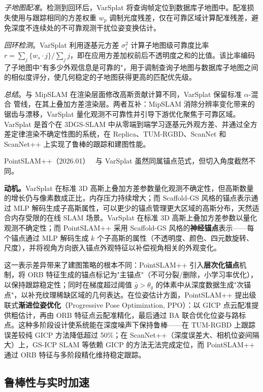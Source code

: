 \textit{子地图配准}。检测到回环后，VarSplat 将查询帧定位到数据库子地图中。配准损失使用与跟踪相同的方差权重 $w_p$ 调制光度残差，仅在可靠区域计算配准残差，避免深度不连续处的不可靠观测干扰位姿变换估计。

\textit{回环检测}。VarSplat 利用逐基元方差 $\sigma_i^2$ 计算子地图级可靠度比率 $r = \sum_j \{w_s \cdot j\} / \sum_j j$，即在应用方差加权前后不透明度之和的比值。该比率编码了子地图中"有多少外观信息是可靠的"，用于调制查询子地图与数据库子地图之间的相似度评分，使几何稳定的子地图获得更高的匹配优先级。

\textit{总结}。与 MipSLAM 在渲染层面修改高斯贡献计算不同，VarSplat 保留标准 $\alpha$-混合 管线，在其上叠加方差渲染层。两者互补：MipSLAM 消除分辨率变化带来的锯齿与漂移，VarSplat 量化观测不可靠性并引导下游优化聚焦于可靠区域。VarSplat 是首个在 3DGS-SLAM 中从零端到端学习逐基元外观方差、并通过全方差定律渲染不确定性图的系统，在 Replica、TUM-RGBD、ScanNet 和 ScanNet++ 上实现了鲁棒的跟踪和建图性能。

PointSLAM++（2026.01）~\cite{2601_11617} 与 VarSplat 虽然同属锚点范式，但切入角度截然不同。

\textbf{动机。}VarSplat 在标准 3D 高斯上叠加方差参数量化观测不确定性，但高斯数量的增长仍与像素数成正比，内存压力持续增大；而 Scaffold-GS 风格的锚点表示通过 MLP 解码生成子高斯属性，可以更少的锚点管理更大区域的高斯分布，天然适合内存受限的在线 SLAM 场景。VarSplat 在标准 3D 高斯上叠加方差参数以量化观测不确定性；而 PointSLAM++ 采用 Scaffold-GS 风格的\textbf{神经锚点}表示——每个锚点通过 MLP 解码生成 $k$ 个子高斯的属性（不透明度、颜色、四元数旋转、尺度），并将视角方向嵌入锚点外观特征以补偿视角相关的外观变化。

这一表示差异带来了建图策略的根本不同：PointSLAM++ 引入\textbf{层次化锚点}机制，将 ORB 特征生成的锚点标记为"主锚点"（不可分裂/删除，小学习率优化），以保持跟踪稳定性；同时在梯度超过阈值 $\bar{g} > \theta_g$ 的体素中从深度数据生成"次锚点"，以补充纹理稀缺区域的几何表达。在位姿估计方面，PointSLAM++ 提出级联式\textbf{渐进位姿优化}（Progressive Pose Optimization, PPO）：以 GICP 点云配准提供粗估计，再由 ORB 特征点云配准精化，最后通过 BA 联合优化位姿与路标点。这种多阶段设计使系统能在深度噪声下保持鲁棒——在 TUM-RGBD 上跟踪误差较纯 GICP 方法降低超过 50\%；在 ScanNet++（深度误差大、相机位姿间隔大）上，GS-ICP SLAM 等依赖 GICP 的方法无法完成定位，而 PointSLAM++ 通过 ORB 特征与多阶段精化维持稳定跟踪。

\subsection{鲁棒性与实时加速}
\label{ss:15_2}

